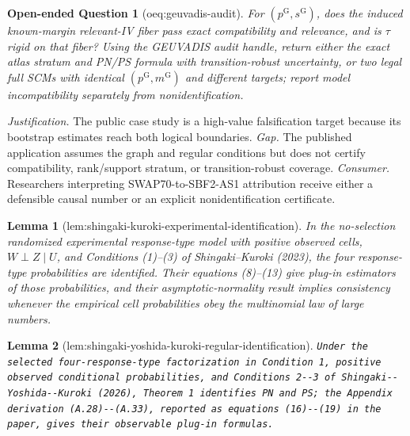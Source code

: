 \documentclass{article}
\newtheorem{lemma}{Lemma}
\newtheorem{openendedquestion}{Open-ended Question}
\begin{document}
\begin{openendedquestion}[oeq:geuvadis-audit]\label{oeq:geuvadis-audit}
For \((p^{\mathrm G},s^{\mathrm G})\), does the induced known-margin relevant-IV fiber pass exact compatibility and relevance, and is \(\tau\) rigid on that fiber? Using the GEUVADIS audit handle, return either the exact atlas stratum and PN/PS formula with transition-robust uncertainty, or two legal full SCMs with identical \((p^{\mathrm G},m^{\mathrm G})\) and different targets; report model incompatibility separately from nonidentification.
\end{openendedquestion}
\par\smallskip\noindent \textit{Justification.} The public case study is a high-value falsification target because its bootstrap estimates reach both logical boundaries. \textit{Gap.} The published application assumes the graph and regular conditions but does not certify compatibility, rank/support stratum, or transition-robust coverage. \textit{Consumer.} Researchers interpreting SWAP70-to-SBF2-AS1 attribution receive either a defensible causal number or an explicit nonidentification certificate.

\begin{lemma}[lem:shingaki-kuroki-experimental-identification]\label{lem:shingaki-kuroki-experimental-identification}
In the no-selection randomized experimental response-type model with positive observed cells, \(W\perp Z\mid U\), and Conditions (1)--(3) of Shingaki--Kuroki (2023), the four response-type probabilities are identified.  Their equations (8)--(13) give plug-in estimators of those probabilities, and their asymptotic-normality result implies consistency whenever the empirical cell probabilities obey the multinomial law of large numbers.
\end{lemma}

\begin{lemma}[lem:shingaki-yoshida-kuroki-regular-identification]\label{lem:shingaki-yoshida-kuroki-regular-identification}
\texttt{Under the selected four-\allowbreak{}response-\allowbreak{}type factorization in Condition 1,\allowbreak{} positive observed conditional probabilities,\allowbreak{} and Conditions 2-\allowbreak{}-\allowbreak{}3 of Shingaki-\allowbreak{}-\allowbreak{}Yoshida-\allowbreak{}-\allowbreak{}Kuroki (2026),\allowbreak{} Theorem 1 identifies PN and PS;\allowbreak{} the Appendix derivation (A.28)-\allowbreak{}-\allowbreak{}(A.33),\allowbreak{} reported as equations (16)-\allowbreak{}-\allowbreak{}(19) in the paper,\allowbreak{} gives their observable plug-\allowbreak{}in formulas.}
\end{lemma}
\end{document}
